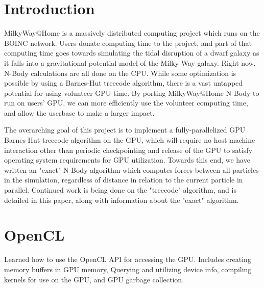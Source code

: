 \documentclass[fleqn,10pt]{SelfArx} %
\begin{document}
\flushbottom %

\maketitle %

\tableofcontents %

\thispagestyle{empty} %


\section*{Introduction} %
MilkyWay@Home is a massively distributed computing project which runs on the BOINC network. Users donate computing time to the project, and part of that computing time goes towards simulating the tidal disruption of a dwarf galaxy as it falls into a gravitational potential model of the Milky Way galaxy. Right now, N-Body calculations are all done on the CPU. While some optimization is possible by using a Barnes-Hut treecode algorithm, there is a vast untapped potential for using volunteer GPU time. By porting MilkyWay@Home N-Body to run on users' GPU, we can more efficiently use the volunteer computing time, and allow the userbase to make a larger impact.

The overarching goal of this project is to implement a fully-parallelized GPU Barnes-Hut treecode algorithm on the GPU, which will require no host machine interaction other than periodic checkpointing and release of the GPU to satisfy operating system requirements for GPU utilization. Towards this end, we have written an "exact" N-Body algorithm which computes forces between all particles in the simulation, regardless of distance in relation to the current particle in parallel. Continued work is being done on the "treecode" algorithm, and is detailed in this paper, along with information about the "exact" algorithm.

\section{OpenCL}
Learned how to use the OpenCL API for accessing the GPU. Includes creating memory buffers in GPU memory, Querying and utilizing device info, compiling kernels for use on the GPU, and GPU garbage collection.
\end{document}
